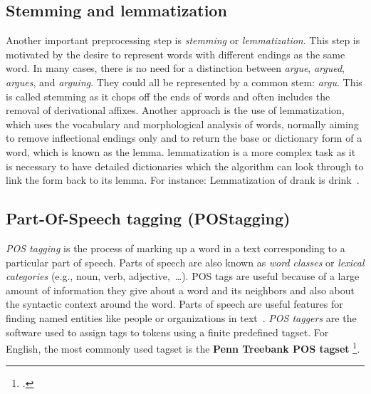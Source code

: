 \subsection{Stemming and  lemmatization}
Another important preprocessing step is \emph{stemming} or \emph{lemmatization}. This step is motivated by the desire to represent words with different endings as the same word. In many cases, there is no need for a distinction between \emph{argue}, \emph{argued}, \emph{argues}, and \emph{arguing}. They could all be represented by a common stem: \emph{argu}. This is called stemming as it chops off the ends of words and often includes the removal of derivational affixes. Another approach is the use of lemmatization, which uses the vocabulary and morphological analysis of words, normally aiming to remove inflectional endings only and to return the base or dictionary form of a word, which is known as the lemma. lemmatization is a more complex task as it is necessary to have detailed dictionaries which the algorithm can look through to link the form back to its lemma. For instance:
Lemmatization of drank is drink~.
\subsection{Part-Of-Speech tagging (POStagging)}
\emph{POS tagging} is the process of marking up a word in a text corresponding to a particular part of speech. Parts of speech are also known as \emph{word classes} or \emph{lexical categories} (e.g., noun, verb, adjective,~\dots). POS tags are useful because of a large amount of information they give about a word and its neighbors and also about the syntactic context around the word. Parts of speech are useful features for finding named entities like people or organizations in text~. \emph{POS taggers} are the software used to assign tags to tokens using a finite predefined tagset. For English, the most commonly used tagset is the \textbf{Penn Treebank POS tagset} \footcite{https://www.ling.upenn.edu/courses/Fall_2003/ling001/penn_treebank_pos.html}. 

